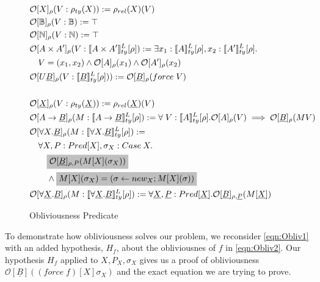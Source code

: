 \documentclass[acmsmall]{acmart}
\newcommand{\den}[1]{\llbracket #1\rrbracket}
\begin{document}
\begin{figure}[H]
  \centering
  \scriptsize
  \begin{align*}
    &\mathcal{O}[X]_{\rho}(V :\rho_{ty}(X)) := \rho_{rel}(X)(V)\\
    &\mathcal{O}[\mathbb{B}]_{\rho} (V : \mathbb{B}):= \top \\%
    &\mathcal{O}[\mathbb{N}]_{\rho}(V : \mathbb{N}) := \top\\%
    &\mathcal{O}[A \times A']_{\rho}(V : \den{A\times A'}^L_{ty}[\rho]) := \exists x_1:\den{A}^L_{ty}[\rho],x_2:\den{A'}^L_{ty}[\rho].\\
    &\quad V = (x_1,x_2) \land \mathcal{O}[A]_{\rho}(x_1) \land \mathcal{O}[A']_{\rho}(x_2)\\
    &\mathcal{O}[U\underline{B}]_{\rho}(V : \den{\underline{B}}^L_{ty}[\rho] )) := \mathcal{O}[\underline{B}]_{\rho}(force\;V)\\
    \\
    & \mathcal{O}[\underline{X}]_{\rho}(V: \rho_{ty}(\underline{X})) := \rho_{rel}(\underline{X})(V)\\
    &\mathcal{O}[A\rightarrow \underline{B}]_{\rho}(M : \den{A \rightarrow \underline{B}}^L_{ty}[\rho]) := \forall\; V :\den{A}^L_{ty}[\rho]. \mathcal{O}[A]_{\rho}(V)\implies \mathcal{O}[\underline{B}]_{\rho}(MV) \\
    &\mathcal{O}[\forall X. \underline{B}]_{\rho}(M :\den{\forall X. \underline{B}}^L_{ty}[\rho]) := \\
    &\quad \forall X,P:Pred[X],\sigma_X:Case\:X.\\
    &\quad \quad \colorbox{lightgray}{$\mathcal{O}[\underline{B}]_{{\rho},P}(M[X](\sigma_X))$} \\
    &\quad \quad \land \colorbox{lightgray}{$M[X](\sigma_X) = (\sigma\leftarrow new_X; M[X](\sigma))$}\\
    &\mathcal{O}[\forall \underline{X}. \underline{B}]_{\rho}(M:\den{\forall \underline{X}. \underline{B}}^L_{ty}[\rho]) := \forall \underline{X},\underline{P}: Pred[\underline{X}].\mathcal{O}[\underline{B}]_{\rho,\underline{P}}(M[\underline{X}]) 
\end{align*}
  \caption{Obliviousness Predicate}
  \label{fig:Oblivious}
\end{figure}

To demonstrate how obliviousness solves our problem, we reconsider \cref{eqn:Obliv1} with an added hypothesis, $H_f$, about the obliviousnes of $f$ in \cref{eqn:Obliv2}. Our hypothesis $H_f$ applied to $X,P_X,\sigma_X$ gives us a proof of obliviousness $\mathcal{O}[\underline{B}]((force\;f)[X]\sigma_X)$ and the exact equation we are trying to prove.
\end{document}
